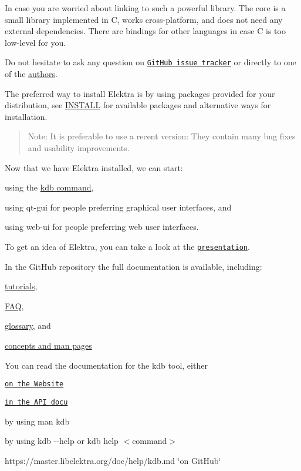 In case you are worried about linking to such a powerful library. The core is a small library implemented in C, works cross-\/platform, and does not need any external dependencies. There are bindings for other languages in case C is too low-\/level for you.

Do not hesitate to ask any question on \href{https://issues.libelektra.org/}{\tt Git\+Hub issue tracker} or directly to one of the \hyperlink{doc_AUTHORS_md}{authors}.

The preferred way to install Elektra is by using packages provided for your distribution, see \hyperlink{doc_INSTALL_md}{I\+N\+S\+T\+A\+LL} for available packages and alternative ways for installation.

\begin{quote}
Note\+: It is preferable to use a recent version\+: They contain many bug fixes and usability improvements. \end{quote}


Now that we have Elektra installed, we can start\+:


\begin{DoxyItemize}
\item using the \hyperlink{doc_help_kdb_md}{kdb command},
\item using qt-\/gui for people preferring graphical user interfaces, and
\item using web-\/ui for people preferring web user interfaces.
\end{DoxyItemize}

To get an idea of Elektra, you can take a look at the \href{https://www.libelektra.org/ftp/elektra/presentations/2016/FOSDEM/fosdem.odp}{\tt presentation}.

In the Git\+Hub repository the full documentation is available, including\+:


\begin{DoxyItemize}
\item \hyperlink{md_doc_tutorials_README_doc_tutorials_README_md}{tutorials},
\item \hyperlink{doc_help_elektra-faq_md}{F\+AQ},
\item \hyperlink{doc_help_elektra-glossary_md}{glossary}, and
\item \hyperlink{doc_help_elektra-introduction_md}{concepts and man pages}
\end{DoxyItemize}

You can read the documentation for the kdb tool, either


\begin{DoxyItemize}
\item \href{https://www.libelektra.org}{\tt on the Website}
\item \href{https://doc.libelektra.org/api/latest/html/doc_help_kdb_md.html}{\tt in the A\+PI docu}
\item by using {\ttfamily man kdb}
\item by using {\ttfamily kdb -\/-\/help} or {\ttfamily kdb help $<$command$>$}
\item https\+://master.libelektra.\+org/doc/help/kdb.md \char`\"{}on Git\+Hub\char`\"{}
\end{DoxyItemize}

